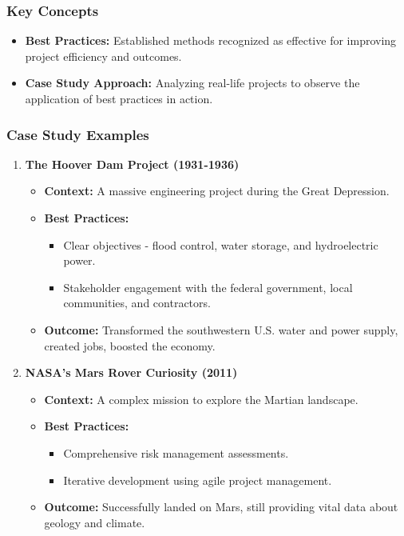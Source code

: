 \documentclass[aspectratio=169]{beamer}
\begin{document}
\begin{frame}[fragile]
    \frametitle{Key Concepts}
    \begin{itemize}
        \item \textbf{Best Practices:} Established methods recognized as effective for improving project efficiency and outcomes.
        \item \textbf{Case Study Approach:} Analyzing real-life projects to observe the application of best practices in action.
    \end{itemize}
\end{frame}

\begin{frame}[fragile]
    \frametitle{Case Study Examples}
    \begin{enumerate}
        \item \textbf{The Hoover Dam Project (1931-1936)}
            \begin{itemize}
                \item \textbf{Context:} A massive engineering project during the Great Depression.
                \item \textbf{Best Practices:}
                    \begin{itemize}
                        \item Clear objectives - flood control, water storage, and hydroelectric power.
                        \item Stakeholder engagement with the federal government, local communities, and contractors.
                    \end{itemize}
                \item \textbf{Outcome:} Transformed the southwestern U.S. water and power supply, created jobs, boosted the economy.
            \end{itemize}
        
        \item \textbf{NASA’s Mars Rover Curiosity (2011)}
            \begin{itemize}
                \item \textbf{Context:} A complex mission to explore the Martian landscape.
                \item \textbf{Best Practices:}
                    \begin{itemize}
                        \item Comprehensive risk management assessments.
                        \item Iterative development using agile project management.
                    \end{itemize}
                \item \textbf{Outcome:} Successfully landed on Mars, still providing vital data about geology and climate.
            \end{itemize}
    \end{enumerate}
\end{frame}
\end{document}
